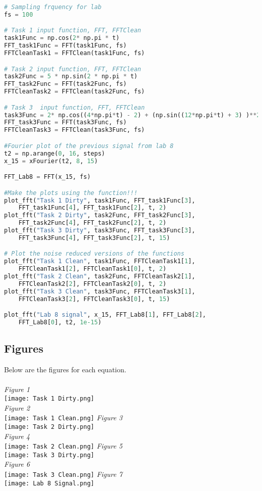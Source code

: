 \documentclass[12pt,a4paper]{article}
\begin{document}
\begin{lstlisting}[language=Python]
# Sampling frquency for lab
fs = 100

# Task 1 input function, FFT, FFTClean
task1Func = np.cos(2* np.pi * t)
FFT_task1Func = FFT(task1Func, fs)
FFTCleanTask1 = FFTClean(task1Func, fs)

# Task 2 input function, FFT, FFTClean
task2Func = 5 * np.sin(2 * np.pi * t)
FFT_task2Func = FFT(task2Func, fs)
FFTCleanTask2 = FFTClean(task2Func, fs)

# Task 3  input function, FFT, FFTClean
task3Func = 2* np.cos((4*np.pi*t) - 2) + (np.sin((12*np.pi*t) + 3) )**2
FFT_task3Func = FFT(task3Func, fs)
FFTCleanTask3 = FFTClean(task3Func, fs)

#Fourier plot of the previous signal from lab 8
t2 = np.arange(0, 16, steps)
x_15 = xFourier(t2, 8, 15)

FFT_Lab8 = FFT(x_15, fs)

#Make the plots using the function!!!
plot_fft("Task 1 Dirty", task1Func, FFT_task1Func[3], 
    FFT_task1Func[4], FFT_task1Func[2], t, 2)
plot_fft("Task 2 Dirty", task2Func, FFT_task2Func[3], 
    FFT_task2Func[4], FFT_task2Func[2], t, 2)
plot_fft("Task 3 Dirty", task3Func, FFT_task3Func[3], 
    FFT_task3Func[4], FFT_task3Func[2], t, 15)

# Plot the noise reduced versions of the functions
plot_fft("Task 1 Clean", task1Func, FFTCleanTask1[1], 
    FFTCleanTask1[2], FFTCleanTask1[0], t, 2)
plot_fft("Task 2 Clean", task2Func, FFTCleanTask2[1], 
    FFTCleanTask2[2], FFTCleanTask2[0], t, 2)
plot_fft("Task 3 Clean", task3Func, FFTCleanTask3[1], 
    FFTCleanTask3[2], FFTCleanTask3[0], t, 15)

plot_fft("Lab 8 signal", x_15, FFT_Lab8[1], FFT_Lab8[2], 
    FFT_Lab8[0], t2, 1e-15)
\end{lstlisting}
\newpage
\subsection{Figures}
Below are the figures for each equation.\\
\\
\textit{Figure 1}
\\
\texttt{[image: Task 1 Dirty.png]}
\\
\textit{Figure 2}
\\
\texttt{[image: Task 1 Clean.png]}
\newpage
\textit{Figure 3}
\\
\texttt{[image: Task 2 Dirty.png]}
\\
\textit{Figure 4}
\\
\texttt{[image: Task 2 Clean.png]}
\newpage
\textit{Figure 5}
\\
\texttt{[image: Task 3 Dirty.png]}
\\
\textit{Figure 6}
\\
\texttt{[image: Task 3 Clean.png]}
\newpage
\textit{Figure 7}
\\
\texttt{[image: Lab 8 Signal.png]}
\newpage
\end{document}

